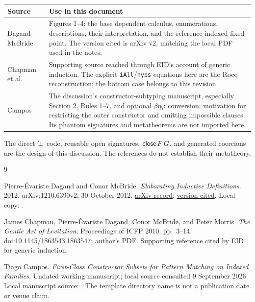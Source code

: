 \newpage
{}
\begin{center}
\begin{tabular}{@{}p{.27\linewidth}p{.67\linewidth}@{}}
\toprule
Source & Use in this document\\
\midrule
Dagand--McBride~\cite{dagand-mcbride-2012}
 & Figures 1--4: the base dependent calculus, enumerations, descriptions,
 their interpretation, and the reference indexed fixed point.
 The version cited is arXiv v2, matching the local PDF used in the notes.\\[5pt]
Chapman et al.~\cite{chapman-et-al-2010}
 & Supporting source reached through EID's account of generic induction.
 The explicit \texttt{iAll}/\texttt{hyps} equations here are the Rocq
 reconstruction; the bottom case belongs to this revision.\\[5pt]
Campos~\cite{campos-constructor-subsets}
 & The discussion's constructor-subtyping manuscript, especially
 Section 2, Rules 1--7, and optional $\beta\eta\varphi$ conversion:
 motivation for restricting the outer constructor and omitting impossible
 clauses. Its phantom signatures and metatheorems are not imported here.\\
\bottomrule
\end{tabular}
\end{center}
The direct ${}^{\prime}\!\bot$ code, reusable open signatures, $\mathsf{close}\,F\,G$,
and generated coercions are the design of this discussion. The references
do not establish their metatheory.

\begin{thebibliography}{9}
\raggedright
{}
Pierre-\'Evariste Dagand and Conor McBride.
\emph{Elaborating Inductive Definitions}.
2012. arXiv:1210.6390v2, 30 October 2012.
\href{https://arxiv.org/abs/1210.6390}{arXiv record};
\href{https://arxiv.org/pdf/1210.6390v2}{version cited}.
Local copy: .

James Chapman, Pierre-\'Evariste Dagand, Conor McBride, and Peter Morris.
\emph{The Gentle Art of Levitation}.
Proceedings of ICFP 2010, pp.~3--14.
\href{https://doi.org/10.1145/1863543.1863547}{doi:10.1145/1863543.1863547};
\href{https://jmchapman.io/papers/levitation.pdf}{author's PDF}.
Supporting reference cited by EID for generic induction.

Tiago Campos.
\emph{First-Class Constructor Subsets for Pattern Matching on Indexed Families}.
Undated working manuscript; local source consulted 9 September 2026.
\href{../../../Subtyping-Theory/subindex/LIPIcs_2021_Version_Sample/subtyping_paper.tex}
 {Local manuscript source}:
.
The template directory name is not a publication date or venue claim.
\end{thebibliography}
